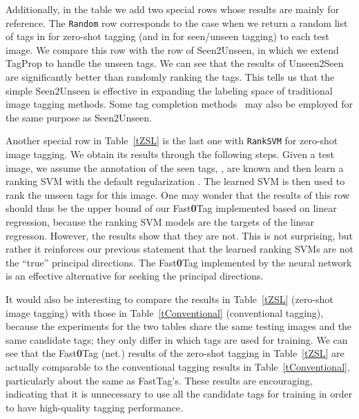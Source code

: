 \documentclass[10pt,twocolumn,letterpaper]{article}
\newcommand{\ours}{{Fast\textbf{0}Tag}}
\begin{document}
Additionally, in the table we add two special rows whose results are mainly for reference. The {\tt Random} row corresponds to the case when we return a random list of tags in  for zero-shot tagging (and in  for seen/unseen tagging) to each test image. We compare this row with the row of Seen2Unseen, in which we extend TagProp to handle the unseen tags. We can see that the results of Unseen2Seen are significantly better than randomly ranking the tags. This tells us that the simple Seen2Unseen is effective in expanding the labeling space of traditional image tagging methods. Some tag completion methods~\cite{sigurbjornsson_flickr_2008} may also be employed for the same purpose as Seen2Unseen.

Another special row in Table~\ref{tZSL} is the last one with {\tt RankSVM} for zero-shot image tagging. We obtain its  results through the following steps. Given a test image, we assume the annotation of the seen tags, , are known and then learn a ranking SVM with the default regularization . The learned SVM is then used to rank the unseen tags for this image. One may wonder that the results of this row should thus be the upper bound of our {\ours} implemented based on linear regression, because the ranking SVM models are the targets of the linear regresson. However, the results show that they are not. This is not surprising, but rather it reinforces our previous statement that the learned ranking SVMs are not the ``true'' principal directions. The {\ours} implemented by the neural network is an effective alternative for seeking the principal directions. 

It would also be interesting to compare the results in Table~\ref{tZSL} (zero-shot image tagging) with those in Table~\ref{tConventional} (conventional tagging), because the experiments for the two tables share the same testing images and the same candidate tags; they only differ in which tags are used for training. We can see that the {\ours} (net.) results of the zero-shot tagging in Table~\ref{tZSL} are actually comparable to the conventional tagging results in Table~\ref{tConventional}, particularly about the same as FastTag's. These results are encouraging, indicating that it is unnecessary to use all the candidate tags for training in order to have high-quality tagging performance.
\vspace{-10pt}
\end{document}
